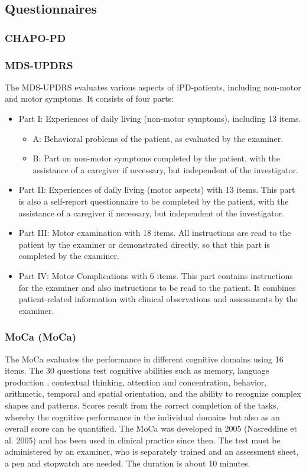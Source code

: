 \subsection{Questionnaires}
\label{subsec:questionnaires}
\subsubsection{\acl{CHAPO-PD}}

\subsubsection{\acl{MDS-UPDRS}}
The \ac{MDS-UPDRS} evaluates various aspects of \ac{iPD}-patients, including non-motor and motor symptoms. It consists of four parts:
\begin{itemize}
\item Part I: Experiences of daily living (non-motor symptoms), including 13 items.
\begin{itemize}
\item A: Behavioral problems of the patient, as evaluated by the examiner.
\item B: Part on non-motor symptoms completed by the patient, with the assistance of a caregiver if necessary, but independent of the investigator.
\end{itemize}
\item Part II: Experiences of daily living (motor aspects) with 13 items. This part is also a self-report questionnaire to be completed by the patient, with the assistance of a caregiver if necessary, but independent of the investigator.
\item Part III: Motor examination with 18 items. All instructions are read to the patient by the examiner or demonstrated directly, so that this part is completed by the examiner.
\item Part IV: Motor Complications with 6 items. This part contains instructions for the examiner and also instructions to be read to the patient. It combines patient-related information with clinical observations and assessments by the examiner.
\end{itemize}

\subsubsection{\acl{MoCa} (\acs{MoCa})}
The \acl{MoCa} evaluates the performance in different cognitive domains using 16 items. The 30 questions test cognitive abilities such as memory, language production , contextual thinking, attention and concentration, behavior, arithmetic, temporal and spatial orientation, and the ability to recognize complex shapes and patterns. Scores result from the correct completion of the tasks, whereby the cognitive performance in the individual domains but also as an overall score can be quantified. The \ac{MoCa} was developed in 2005 (Nasreddine et al. 2005) and has been used in clinical practice since then. The test must be administered by an examiner, who is separately trained and an assessment sheet, a pen and stopwatch are needed. The duration is about 10 minutes.

